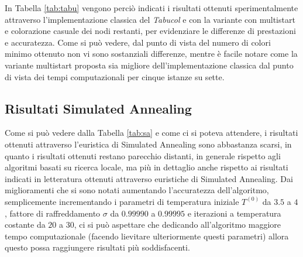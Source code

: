\documentclass[a4paper,10pt]{article}
\newcommand{\tabucol}{\emph{Tabucol}}
\begin{document}
In Tabella \ref{tab:tabu} vengono perciò indicati i risultati ottenuti sperimentalmente attraverso l'implementazione classica del \tabucol{} e con la variante con multistart e colorazione casuale dei nodi restanti, per evidenziare le differenze di prestazioni e accuratezza. Come si può vedere, dal punto di vista del numero di colori minimo ottenuto non vi sono sostanziali differenze, mentre è facile notare come la variante multistart proposta sia migliore dell'implementazione classica dal punto di vista dei tempi computazionali per cinque istanze su sette. 

\subsection{Risultati Simulated Annealing}
Come si può vedere dalla Tabella \ref{tab:sa} e come ci si poteva attendere, i risultati ottenuti attraverso l'euristica di Simulated Annealing sono abbastanza scarsi, in quanto i risultati ottenuti restano parecchio distanti, in generale rispetto agli algoritmi basati su ricerca locale, ma più in dettaglio anche rispetto ai risultati indicati in letteratura ottenuti attraverso euristiche di Simulated Annealing. Dai miglioramenti che si sono notati aumentando l'accuratezza dell'algoritmo, semplicemente incrementando i parametri di temperatura iniziale $T^{(0)}$ da $3.5$ a $4$, fattore di raffreddamento $\sigma$ da $0.99990$ a $0.99995$ e iterazioni a temperatura costante da $20$ a $30$, ci si può aspettare che dedicando all'algoritmo maggiore tempo computazionale (facendo lievitare ulteriormente questi parametri) allora questo possa raggiungere risultati più soddisfacenti.
\end{document}
